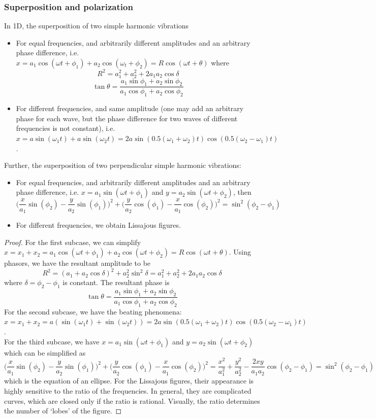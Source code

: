 \documentclass[a4paper]{article}
\begin{document}
\subsubsection*{Superposition and polarization}
\begin{thm}
In 1D, the superposition of two simple harmonic vibrations
\begin{itemize}
    \item For equal frequencies, and arbitrarily different amplitudes and an arbitrary phase difference, i.e. $x=a_1\cos(\omega t+\phi_1)+a_2\cos(\omega_t+\phi_2)=R\cos(\omega t+\theta)$ where
    $$R^2=a_1^2+a_2^2+2a_1a_2\cos\delta$$
    $$\tan\theta=\frac{a_1\sin\phi_1+a_2\sin\phi_2}{a_1\cos\phi_1+a_2\cos\phi_2}$$
    \item For different frequencies, and same amplitude (one may add an arbitrary phase for each wave, but the phase difference for two waves of different frequencies is not constant), i.e. $x=a\sin(\omega_1t)+a\sin(\omega_2t)=2a\sin(0.5(\omega_1+\omega_2)t)\cos(0.5(\omega_2-\omega_1)t)$.
\end{itemize}
Further, the superposition of two perpendicular simple harmonic vibrations:
\begin{itemize}
    \item For equal frequencies, and arbitrarily different amplitudes and an arbitrary phase difference, i.e. $x=a_1\sin(\omega t+\phi_1)$ and $y=a_2\sin(\omega t+\phi_2)$, then
    $$\bigg(\frac{x}{a_1}\sin(\phi_2)-\frac{y}{a_2}\sin(\phi_1)\bigg)^2+\bigg(\frac{y}{a_2}\cos(\phi_1)-\frac{x}{a_1}\cos(\phi_2)\bigg)^2=\sin^2(\phi_2-\phi_1)$$
    \item For different frequencies, we obtain Lissajous figures.
\end{itemize}
\end{thm}
\begin{proof}
For the first subcase, we can simplify $x=x_1+x_2=a_1\cos(\omega t+\phi_1)+a_2\cos(\omega t+\phi_2)=R\cos(\omega t+\theta)$. Using phasors, we have the resultant amplitude to be
$$R^2=(a_1+a_2\cos\delta)^2+a_2^2\sin^2\delta=a_1^2+a_2^2+2a_1a_2\cos\delta$$
where $\delta=\phi_2-\phi_1$ is constant. The resultant phase is
$$\tan\theta=\frac{a_1\sin\phi_1+a_2\sin\phi_2}{a_1\cos\phi_1+a_2\cos\phi_2}$$
For the second subcase, we have the beating phenomena: $x=x_1+x_2=a(\sin(\omega_1t)+\sin(\omega_2t))=2a\sin(0.5(\omega_1+\omega_2)t)\cos(0.5(\omega_2-\omega_1)t)$.\\[5pt]
For the third subcase, we have $x=a_1\sin(\omega t+\phi_1)$ and $y=a_2\sin(\omega t+\phi_2)$ which can be simplified as
$$\bigg(\frac{x}{a_1}\sin(\phi_2)-\frac{y}{a_2}\sin(\phi_1)\bigg)^2+\bigg(\frac{y}{a_2}\cos(\phi_1)-\frac{x}{a_1}\cos(\phi_2)\bigg)^2=\frac{x^2}{a_1^2}+\frac{y^2}{a_2^2}-\frac{2xy}{a_1a_2}\cos(\phi_2-\phi_1)=\sin^2(\phi_2-\phi_1)$$
which is the equation of an ellipse. For the Lissajous figures, their appearance is highly sensitive to the ratio of the frequencies. In general, they are complicated curves, which are closed only if the ratio  is rational. Visually, the ratio determines the number of `lobes' of the figure.
\end{proof}
\end{document}
